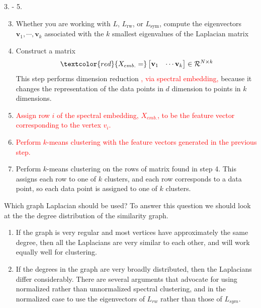 \documentclass{beamer}
\begin{document}
\begin{frame}{3. - 5.}
    \begin{enumerate}
     \setcounter{enumi}{2}
        \item Whether you are working with $L$, $L_{\textrm{rw}}$, or $L_{\textrm{sym}}$, compute the eigenvectors
        $
        \mathbf{v}_1, \cdots, \mathbf{v}_k
        $
        associated with the $k$ smallest eigenvalues of the Laplacian matrix
        \item Construct a matrix
        $$ \textcolor{red}{X_{emb.} = }
        \begin{bmatrix}
            \mathbf{v}_1 & \cdots \mathbf{v}_k
        \end{bmatrix} \in \mathcal{R}^{N \times k}
        $$
        This step performs dimension reduction \textcolor{red}{, via spectral embedding, } because it changes the representation of the data points in $d$ dimension to points in $k$ dimensions.
    \item \textcolor{red}{Assign row $i$ of the spectral embedding, $X_{emb.}$, to be the feature vector corresponding to the vertex $v_i$. }
    \item \textcolor{red}{Perform $k$-means clustering with the feature vectors generated in the previous step.}
    \item Perform $k$-means clustering on the rows of matrix found in step 4. This assigns each row to one of $k$ clusters, and each row corresponds to a data point, so each data point is assigned to one of $k$ clusters.
    \end{enumerate}
\end{frame}

\begin{frame}{Which graph Laplacian should be used?}
To answer this question we should look at the the degree distribution of the similarity graph. 

\begin{enumerate}
    \item If the graph is very regular and most vertices
have approximately the same degree, then all the Laplacians are very similar to each other, and will
work equally well for clustering. 
\item If the degrees in the graph are very broadly distributed,
then the Laplacians differ considerably. There are several arguments that advocate for using normalized rather than unnormalized spectral clustering, and in the normalized case to use
the eigenvectors of $L_{rw}$ rather than those of $L_{sym}$.
\end{enumerate}
    
\end{frame}
\end{document}
